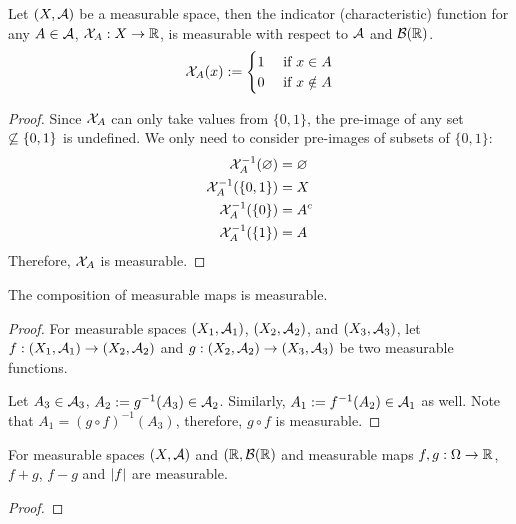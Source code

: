 \documentclass[11pt]{article}
\numberwithin{equation}{section}
\begin{document}
	\begin{theorem}
		Let $(X, \mathcal{{A}})$ be a measurable space, then the indicator (characteristic) function for any $A \in \mathcal{{A}}$, $\mathcal{{X}}_A: X \to \mathbb{R}$, is measurable with respect to $\mathcal{{A}}$ and $\mathcal{{B}}(\mathbb{R})$.
		\begin{align}
			\mathcal{{X}}_A(x) := \begin{cases}
				1 &\text{{ if }} x \in A \\
				0 &\text{{ if }} x \notin A
			\end{cases}
		\end{align}
	\end{theorem}
	
	\begin{proof}
		Since $\mathcal{{X}}_A$ can only take values from $\{0, 1\}$, the pre-image of any set $\centernot \subseteq \{0, 1\}$ is undefined.
		We only need to consider pre-images of subsets of $\{0, 1\}$:
		\begin{align}
			\mathcal{{X}}_A^{-1}(\varnothing) &= \varnothing \\
			\mathcal{{X}}_A^{-1}(\{0, 1\}) &= X \\
			\mathcal{{X}}_A^{-1}(\{0\}) &= A^c \\
			\mathcal{{X}}_A^{-1}(\{1\}) &= A
		\end{align}
		Therefore, $\mathcal{{X}}_A$ is measurable.
	\end{proof}
	
	\begin{theorem}
		The composition of measurable maps is measurable.
	\end{theorem}
	
	\begin{proof}
		For measurable spaces $(X_1, \mathcal{{A}}_1)$, $(X_2, \mathcal{{A}}_2)$, and $(X_3, \mathcal{{A}}_3)$, let $f: (X_1, \mathcal{{A}}_1) \to (X_2, \mathcal{{A}}_2)$ and $g: (X_2, \mathcal{{A}}_2) \to (X_3, \mathcal{{A}}_3)$ be two measurable functions.
		
		Let $A_3 \in \mathcal{{A}}_3$, $A_2 := g^{-1}(A_3) \in \mathcal{{A}}_2$. Similarly, $A_1 := f^{-1}(A_2) \in \mathcal{{A}}_1$ as well. Note that $A_1 = (g \circ f)^{-1}(A_3)$, therefore, $g \circ f$ is measurable.
	\end{proof}
	
	\begin{theorem}
		For measurable spaces $(X, \mathcal{{A}})$ and $(\mathbb{R}, \mathcal{{B}}(\mathbb{R})$ and measurable maps $f, g: \Omega \to \mathbb{R}$, $f + g$, $f - g$ and $\left \vert {f} \right \vert$ are measurable.
	\end{theorem}
	
	\begin{proof}
		
	\end{proof}
	
\end{document}
